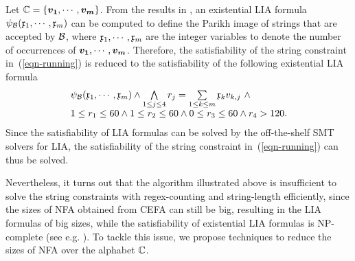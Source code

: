%
Let $\costset = \{\myvec{v_1}, \cdots, \myvec{v_m}\}$. 
From the results in \cite{SSMH04,VSS05}, an existential LIA formula $\psi_{\mathcal{B}}(\mathfrak{x}_1, \cdots, \mathfrak{x}_m)$ can be computed to define the Parikh image of strings that are accepted by $\mathcal{B}$, where $\mathfrak{x}_1, \cdots, \mathfrak{x}_m$ are the integer variables to denote the number of occurrences of $\myvec{v_1}, \cdots, \myvec{v_m}$.
Therefore, the satisfiability of the string constraint in~(\ref{eqn-running}) is reduced to the satisfiability of the following existential LIA formula
\begin{equation}\label{eqn-LIA}
\begin{array}{l}
\psi_{\mathcal{B}}(\mathfrak{x}_1, \cdots, \mathfrak{x}_m) \wedge \bigwedge \limits_{1 \le j \le 4} r_j = \sum \limits_{1\le k \le m}  \mathfrak{x}_k v_{k, j}\ \wedge \\
1 \le r_1 \le 60 \wedge 1 \le r_2 \le 60 \wedge 0 \le r_3 \le 60 \wedge r_4 > 120.
\end{array}
\end{equation}
Since the satisfiability of LIA formulas can be solved by the off-the-shelf SMT solvers for LIA, the satisfiability of the string constraint in~(\ref{eqn-running}) can thus be solved.

Nevertheless, it turns out that the algorithm illustrated above is insufficient to solve the string constraints with regex-counting and string-length efficiently, since the sizes of NFA obtained from CEFA can still be big, resulting  in  the LIA formulas of big sizes, while the satisfiability of existential LIA formulas is NP-complete (see e.g. \cite{Haase18}). 
To tackle this issue, we propose techniques to reduce the sizes of NFA over the alphabet $\mathbb{C}$.



